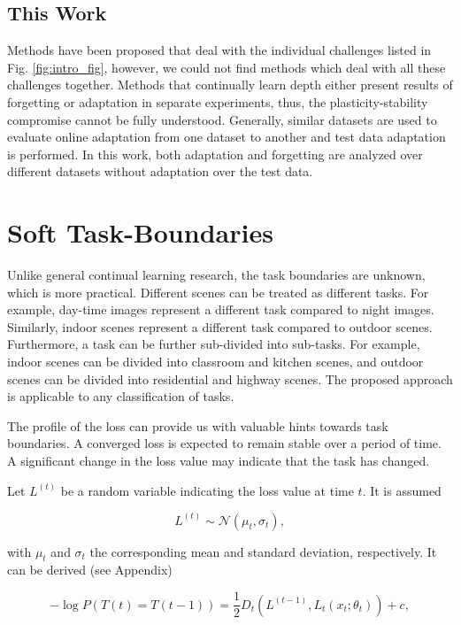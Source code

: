 \documentclass[lettersize,journal]{IEEEtran}
\begin{document}
 \subsection{This Work}
\noindent Methods have been proposed that deal with the individual challenges listed in Fig. \ref{fig:intro_fig}, however, we could not find methods which deal with all these challenges together. Methods that continually learn depth either present results of forgetting or adaptation in separate experiments, thus, the plasticity-stability compromise cannot be fully understood. Generally, similar datasets are used to evaluate online adaptation from one dataset to another and test data adaptation is performed. In this work, both adaptation and forgetting are analyzed over different datasets without adaptation over the test data. 
 
 \section{Soft Task-Boundaries}
 \noindent Unlike general continual learning research, the task boundaries are unknown, which is more practical. Different scenes can be treated as different tasks. For example, day-time images represent a different task compared to night images. Similarly, indoor scenes represent a different task compared to outdoor scenes. Furthermore, a task can be further sub-divided into sub-tasks. For example, indoor scenes can be divided into classroom and kitchen scenes, and outdoor scenes can be divided into residential and highway scenes. The proposed approach is applicable to any classification of tasks.
 
 The profile of the loss can provide us with valuable hints towards task boundaries. A converged loss is expected to remain stable over a period of time. A significant change in the loss value may indicate that the task has changed. 
 
 Let $L^{(t)}$ be a random variable indicating the loss value at time $t$. It is assumed 
 
 \begin{equation}
    L^{(t)} \sim \mathcal{N}(\mu_t, \sigma_t),
 \end{equation}
 
 \noindent with $\mu_t$ and $\sigma_t$ the corresponding mean and standard deviation, respectively. It can be derived (see Appendix)
 
 \begin{equation}
   -\log P(T(t) = T(t - 1)) = \frac{1}{2}D_t(L^{(t - 1)}, L_{t}(x_t; \theta_{t})) + c,
 \end{equation}
 
\end{document}
